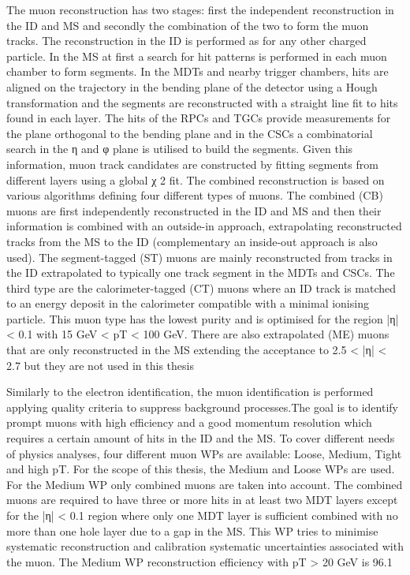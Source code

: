 The muon reconstruction has two stages: first the independent reconstruction in the ID and MS
and secondly the combination of the two to form the muon tracks. The reconstruction in the ID is
performed as for any other charged particle.
In the MS at first a search for hit patterns is performed in each muon chamber to form segments. In
the MDTs and nearby trigger chambers, hits are aligned on the trajectory in the bending plane of
the detector using a Hough transformation and the segments are reconstructed with a straight line
fit to hits found in each layer. The hits of the RPCs and TGCs provide measurements for the plane
orthogonal to the bending plane and in the CSCs a combinatorial search in the η and φ plane is
utilised to build the segments. Given this information, muon track candidates are constructed by
fitting segments from different layers using a global χ
2 fit.
The combined reconstruction is based on various algorithms defining four different types of muons.
The combined (CB) muons are first independently reconstructed in the ID and MS and then their
information is combined with an outside-in approach, extrapolating reconstructed tracks from the MS
to the ID (complementary an inside-out approach is also used). The segment-tagged (ST) muons are
mainly reconstructed from tracks in the ID extrapolated to typically one track segment in the MDTs
and CSCs. The third type are the calorimeter-tagged (CT) muons where an ID track is matched to an
energy deposit in the calorimeter compatible with a minimal ionising particle. This muon type has
the lowest purity and is optimised for the region |η| < 0.1 with 15 GeV < pT < 100 GeV. There
are also extrapolated (ME) muons that are only reconstructed in the MS extending the acceptance to
2.5 < |η| < 2.7 but they are not used in this thesis

Similarly to the electron identification, the muon identification is performed applying quality criteria
to suppress background processes.The goal is to identify prompt muons with high efficiency and a
good momentum resolution which requires a certain amount of hits in the ID and the MS. To cover
different needs of physics analyses, four different muon WPs are available: Loose, Medium, Tight
and high pT. For the scope of this thesis, the Medium and Loose WPs are used.
For the Medium WP only combined muons are taken into account. The combined muons are required
to have three or more hits in at least two MDT layers except for the |η| < 0.1 region where only one
MDT layer is sufficient combined with no more than one hole layer due to a gap in the MS. This WP
tries to minimise systematic reconstruction and calibration systematic uncertainties associated with
the muon. The Medium WP reconstruction efficiency with pT > 20 GeV is 96.1%

